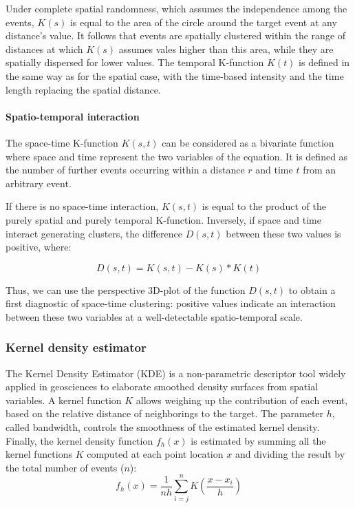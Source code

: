 \documentclass[
]{article}
\begin{document}
Under complete spatial randomness, which assumes the independence among the events, \(K(s)\) is equal to the area of the circle around the target event at any distance's value.
It follows that events are spatially clustered within the range of distances at which \(K(s)\) assumes vales higher than this area, while they are spatially dispersed for lower values.
The temporal K-function \(K(t)\) is defined in the same way as for the spatial case, with the time-based intensity and the time length replacing the spatial distance.

\paragraph{Spatio-temporal interaction}\label{spatio-temporal-interaction}

The space-time K-function \(K(s,t)\) can be considered as a bivariate function where space and time represent the two variables of the equation.
It is defined as the number of further events occurring within a distance \(r\) and time \(t\) from an arbitrary event.

If there is no space-time interaction, \(K(s,t)\) is equal to the product of the purely spatial and purely temporal K-function.
Inversely, if space and time interact generating clusters, the difference \(D(s,t)\) between these two values is positive, where:

\[D(s,t)=K(s,t)-K(s)*K(t)\]

Thus, we can use the perspective 3D-plot of the function \(D(s,t)\) to obtain a first diagnostic of space-time clustering: positive values indicate an interaction between these two variables at a well-detectable spatio-temporal scale.

\subsubsection{Kernel density estimator}\label{kernel-density-estimator}

The Kernel Density Estimator (KDE) is a non-parametric descriptor tool widely applied in geosciences to elaborate smoothed density surfaces from spatial variables.
A kernel function \(K\) allows weighing up the contribution of each event, based on the relative distance of neighborings to the target.
The parameter \(h\), called bandwidth, controls the smoothness of the estimated kernel density.
Finally, the kernel density function \(f_h(x)\) is estimated by summing all the kernel functions \(K\) computed at each point location \(x\) and dividing the result by the total number of events (\(n\)): \[f_h(x) = \frac{1}{nh}\sum_{i=j}^{n}K(\frac{x-x_i}{h})\]
\end{document}
